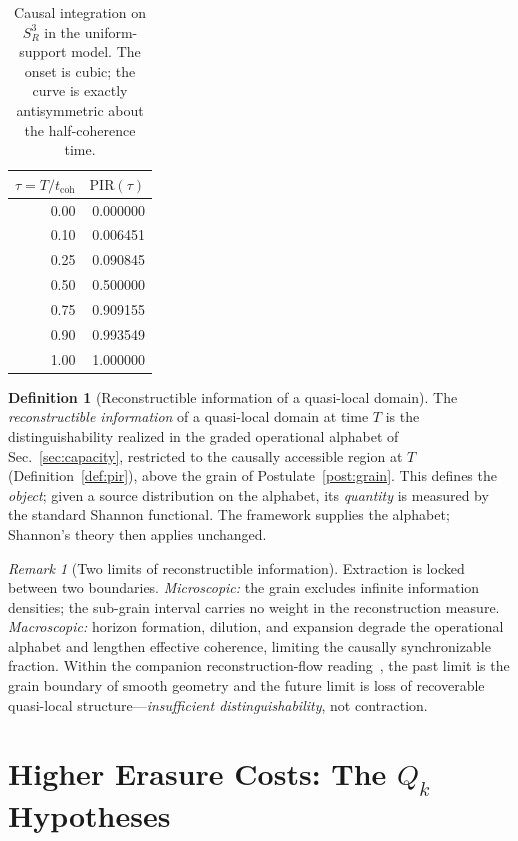 \documentclass[11pt,a4paper]{article}
\theoremstyle{definition}
\newtheorem{definition}[theorem]{Definition}
\theoremstyle{remark}
\newtheorem{remark}[theorem]{Remark}
\newcommand{\Sthree}{S^{3}}
\newcommand{\PIR}{\mathrm{PIR}}
\newcommand{\tcoh}{t_{\mathrm{coh}}}
\begin{document}
\begin{table}[ht]
\centering
\small
\begin{tabular}{r r}
\toprule
$\tau=T/\tcoh$ & $\PIR(\tau)$\\
\midrule
0.00 & 0.000000\\
0.10 & 0.006451\\
0.25 & 0.090845\\
0.50 & 0.500000\\
0.75 & 0.909155\\
0.90 & 0.993549\\
1.00 & 1.000000\\
\bottomrule
\end{tabular}
\caption{Causal integration on $\Sthree_{R}$ in the uniform-support model.  The onset is
cubic; the curve is exactly antisymmetric about the half-coherence time.}
\label{tab:pir}
\end{table}

\begin{definition}[Reconstructible information of a quasi-local domain]
\label{def:reconstructible}
The \emph{reconstructible information} of a quasi-local domain at time $T$ is the
distinguishability realized in the graded operational alphabet of
Sec.~\ref{sec:capacity}, restricted to the causally accessible region at $T$
(Definition~\ref{def:pir}), above the grain of Postulate~\ref{post:grain}.  This defines the
\emph{object}; given a source distribution on the alphabet, its \emph{quantity} is measured by
the standard Shannon functional.  The framework supplies the alphabet; Shannon's theory then
applies unchanged.
\end{definition}

\begin{remark}[Two limits of reconstructible information]
Extraction is locked between two boundaries.  \emph{Microscopic:} the grain excludes infinite
information densities; the sub-grain interval carries no weight in the reconstruction measure.
\emph{Macroscopic:} horizon formation, dilution, and expansion degrade the operational alphabet
and lengthen effective coherence, limiting the causally synchronizable fraction.  Within the
companion reconstruction-flow reading~\cite{BP2026ricci}, the past limit is the grain boundary
of smooth geometry and the future limit is loss of recoverable quasi-local
structure---\emph{insufficient distinguishability}, not contraction.
\end{remark}

\section{Higher Erasure Costs: The \texorpdfstring{$Q_{k}$}{Qk} Hypotheses}
\label{sec:qk}
\end{document}

